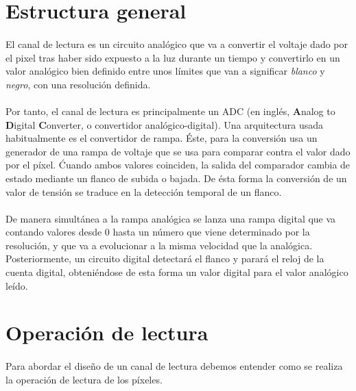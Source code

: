 \section{Estructura general}\label{cap:ro_sch_estructura}

\paragraph{}
El canal de lectura es un circuito analógico que va a convertir el voltaje
dado por el pixel tras haber sido expuesto a la luz durante un tiempo y
convertirlo en un valor analógico bien definido entre unos límites que van a
significar \textit{blanco} y \textit{negro}, con una resolución definida.

\paragraph{}
Por tanto, el canal de lectura es principalmente un ADC (en inglés, \textbf{A}nalog
to \textbf{D}igital \textbf{C}onverter, o convertidor analógico-digital).
Una arquitectura usada habitualmente es el convertidor de rampa.
Éste, para la conversión usa un generador de una rampa de voltaje que se usa para
comparar contra el valor dado por el píxel. Ćuando ambos valores coinciden,
la salida del comparador cambia de estado mediante un flanco de subida o bajada.
De ésta forma la conversión de un valor de tensión se traduce en la detección temporal
de un flanco.

\paragraph{}
De manera simultánea a la rampa analógica se lanza una rampa digital que va contando
valores desde 0 hasta un número que viene determinado por la resolución, y que va a
evolucionar a la misma velocidad que la analógica. Posteriormente, un circuito digital
detectará el flanco y parará el reloj de la cuenta digital, obteniéndose de esta forma
un valor digital para el valor analógico leído.

\section{Operación de lectura}\label{cap:ro_sch_operacion}

\paragraph{}
Para abordar el diseño de un canal de lectura debemos entender como se realiza la
operación de lectura de los píxeles.

